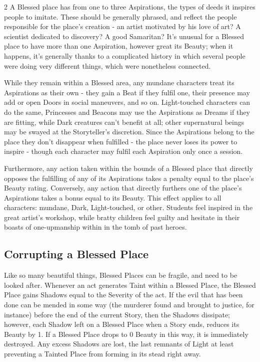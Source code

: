 \begin{multicols}{2}
A Blessed place has from one to three Aspirations, the types of deeds it inspires people to imitate. These should be generally phrased, and reflect the people responsible for the place’s creation - an artist motivated by his love of art? A scientist dedicated to discovery? A good Samaritan? It’s unusual for a Blessed place to have more than one Aspiration, however great its Beauty; when it happens, it’s generally thanks to a complicated history in which several people were doing very different things, which were nonetheless connected.

While they remain within a Blessed area, any mundane characters treat its Aspirations as their own - they gain a Beat if they fulfil one, their presence may add or open Doors in social maneuvers, and so on. Light-touched characters can do the same, Princesses and Beacons may use the Aspirations as Dreams if they are fitting, while Dark creatures can’t benefit at all; other supernatural beings may be swayed at the Storyteller’s discretion. Since the Aspirations belong to the place they don’t disappear when fulfilled - the place never loses its power to inspire - though each character may fulfil each Aspiration only once a session.

Furthermore, any action taken within the bounds of a Blessed place that directly opposes the fulfilling of any of its Aspirations takes a penalty equal to the place’s Beauty rating. Conversely, any action that directly furthers one of the place’s Aspirations takes a bonus equal to its Beauty. This effect applies to all characters: mundane, Dark, Light-touched, or other. Students feel inspired in the great artist's workshop, while bratty children feel guilty and hesitate in their boasts of one-upmanship within in the tomb of past heroes.  

\subsection*{Corrupting a Blessed Place}

Like so many beautiful things, Blessed Places can be fragile, and need to be looked after. Whenever an act generates Taint within a Blessed Place, the Blessed Place gains Shadows equal to the Severity of the act. If the evil that has been done can be mended in some way (the murderer found and brought to justice, for instance) before the end of the current Story, then the Shadows dissipate; however, each Shadow left on a Blessed Place when a Story ends, reduces its Beauty by 1. If a Blessed Place drops to 0 Beauty in this way, it is immediately destroyed. Any excess Shadows are lost, the last remnants of Light at least preventing a Tainted Place from forming in its stead right away.


\end{multicols}
